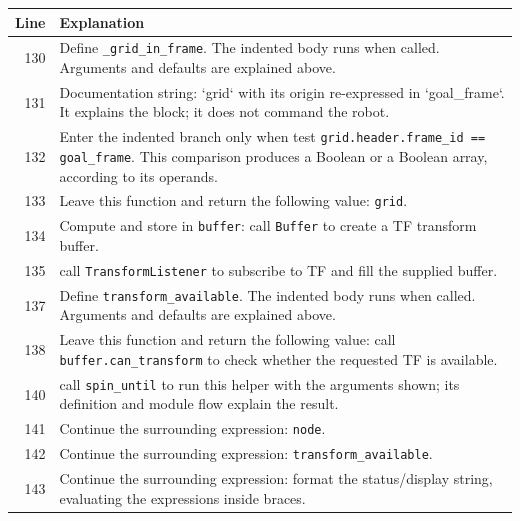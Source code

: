 \documentclass[11pt,a4paper]{book}
\begin{document}
\begin{longtable}{r p{}}

\textbf{Line} & \textbf{Explanation} \\ \hline \endhead

130 & Define \texttt{\_grid\_in\_frame}. The indented body runs when called. Arguments and defaults are explained above. \\

131 & Documentation string: `grid` with its origin re-expressed in `goal\_frame`. It explains the block; it does not command the robot. \\

132 & Enter the indented branch only when test \texttt{grid.header.frame\_id == goal\_frame}. This comparison produces a Boolean or a Boolean array, according to its operands. \\

133 & Leave this function and return the following value: \texttt{grid}. \\

134 & Compute and store in \texttt{buffer}: call \texttt{Buffer} to create a TF transform buffer.  \\

135 & call \texttt{TransformListener} to subscribe to TF and fill the supplied buffer. \\

137 & Define \texttt{transform\_available}. The indented body runs when called. Arguments and defaults are explained above. \\

138 & Leave this function and return the following value: call \texttt{buffer.can\_transform} to check whether the requested TF is available. \\

140 & call \texttt{spin\_until} to run this helper with the arguments shown; its definition and module flow explain the result. \\

141 & Continue the surrounding expression: \texttt{node}. \\

142 & Continue the surrounding expression: \texttt{transform\_available}. \\

143 & Continue the surrounding expression: format the status/display string, evaluating the expressions inside braces. \\


\end{longtable}
\end{document}

